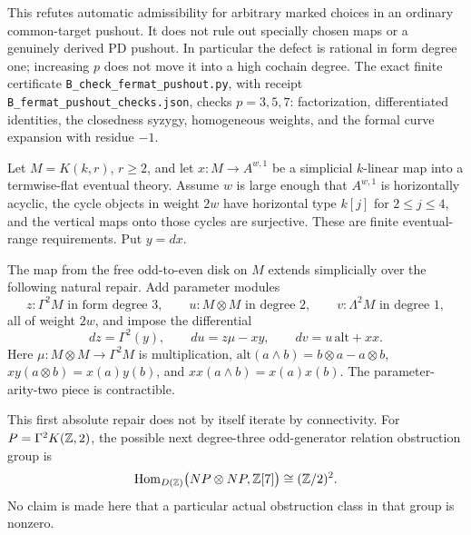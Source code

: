 This refutes automatic admissibility for arbitrary marked
choices in an ordinary common-target pushout. It does
not rule out specially chosen maps or a genuinely
derived PD pushout. In particular the defect is
rational in form degree one; increasing $p$ does
not move it into a high cochain degree.
The exact finite certificate
\texttt{B\_check\_fermat\_pushout.py}, with receipt
\texttt{B\_fermat\_pushout\_checks.json}, checks
$p=3,5,7$: factorization, differentiated identities,
the closedness syzygy, homogeneous weights, and
the formal curve expansion with residue $-1$.

\begin{proposition}
\label{sa08:C20}
Let $M=K(k,r)$, $r\geq2$, and let
$x:M\to A^{w,1}$ be a simplicial $k$-linear map
into a termwise-flat eventual theory. Assume $w$
is large enough that $A^{w,1}$ is horizontally
acyclic, the cycle objects in weight $2w$ have
horizontal type $k[j]$ for $2\leq j\leq4$, and
the vertical maps onto those cycles are surjective.
These are finite eventual-range requirements.
Put $y=dx$.

The map from the free odd-to-even disk on $M$
extends simplicially over the following natural
repair. Add parameter modules
\[
 z:\Gamma^2M\text{ in form degree }3,\qquad
 u:M\otimes M\text{ in degree }2,\qquad
 v:\Lambda^2M\text{ in degree }1,
\]
all of weight $2w$, and impose the differential
\[
 dz=\Gamma^2(y),\qquad
 du=z\mu-xy,\qquad
 dv=u\,\mathrm{alt}+xx.
\]
Here $\mu:M\otimes M\to\Gamma^2M$ is multiplication,
$\mathrm{alt}(a\wedge b)=b\otimes a-a\otimes b$,
$xy(a\otimes b)=x(a)y(b)$, and
$xx(a\wedge b)=x(a)x(b)$.
The parameter-arity-two piece is contractible.

This first absolute repair does not by itself
iterate by connectivity. For
$P=\Gamma^2K(\mathbb Z,2)$, the possible next
degree-three odd-generator relation obstruction
group is
\[
 \operatorname{Hom}_{D(\mathbb Z)}
 \bigl(NP\otimes NP,\mathbb Z[7]\bigr)
 \cong(\mathbb Z/2)^2.
\]
No claim is made here that a particular actual
obstruction class in that group is nonzero.
\end{proposition}
